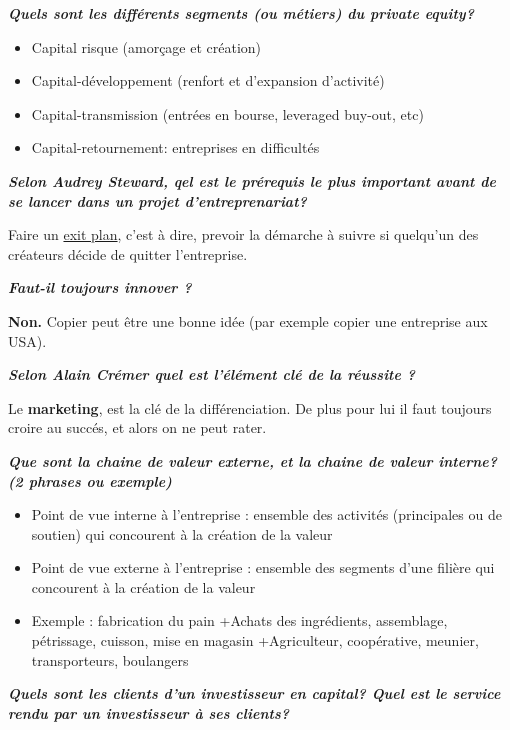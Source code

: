 \documentclass[12pt,oneside,a4paper]{article}
\begin{document}
\textbf{\emph{Quels sont les différents segments (ou métiers) du private equity?}}

\begin{itemize}[label=]
	\item Capital risque (amorçage et création)
    \item Capital-développement (renfort et d'expansion d'activité)
    \item Capital-transmission (entrées en bourse, leveraged buy-out, etc)
    \item Capital-retournement: entreprises en difficultés
\end{itemize}


\textbf{\emph{Selon Audrey Steward, qel est le prérequis le plus important avant de se lancer dans un projet d'entreprenariat?}}

Faire un \underline{exit plan}, c'est à dire, prevoir la démarche à suivre si quelqu'un des créateurs décide de quitter l'entreprise.

\textbf{\emph{Faut-il toujours innover ?}}

\textbf{Non.} Copier peut être une bonne idée (par exemple copier une entreprise aux USA).

\textbf{\emph{Selon Alain Crémer quel est l'élément clé de la réussite ?}}

Le \textbf{marketing}, est la clé de la différenciation. De plus pour lui il faut toujours croire au succés, et alors on ne peut rater. 



\textbf{\emph{Que sont la chaine de valeur externe, et la chaine de valeur interne? (2 phrases ou exemple)}}

\begin{itemize}[label=]
    \item Point de vue interne à l’entreprise : ensemble des activités (principales ou de soutien) qui concourent à la création de la valeur
    \item Point de vue externe à l’entreprise : ensemble des segments d’une filière qui concourent à la création de la  valeur
    \item Exemple : fabrication du pain
        \subitem +Achats des ingrédients, assemblage, pétrissage, cuisson, mise en magasin
        \subitem +Agriculteur, coopérative, meunier, transporteurs, boulangers
\end{itemize}

\textbf{\emph{Quels sont les clients d'un investisseur en capital? Quel est le service rendu par un investisseur à ses clients?}}
\end{document}
